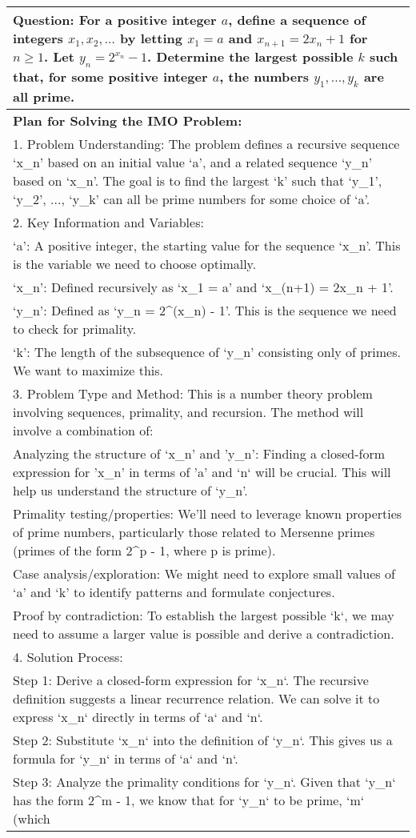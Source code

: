 \begin{table*}
\centering
\scriptsize
\begin{tabular}{p{\linewidth}}
\toprule
\textbf{Question:} For a positive integer $a$, define a sequence of integers $x_{1}, x_{2}, \ldots$ by letting $x_{1}=a$ and $x_{n+1}=2 x_{n}+1$ for $n\geq1$. Let $y_{n}=2^{x_{n}}-1$. Determine the largest possible $k$ such that, for some positive integer $a$, the numbers $y_{1}, \ldots, y_{k}$ are all prime. \\ \midrule
\textbf{Plan for Solving the IMO Problem:}\\ 1. Problem Understanding: The problem defines a recursive sequence `x\_n' based on an initial value `a', and a related sequence `y\_n' based on `x\_n'. The goal is to find the largest `k' such that `y\_1', `y\_2', ..., `y\_k' can all be prime numbers for some choice of `a'.\\2. Key Information and Variables:\\ `a': A positive integer, the starting value for the sequence `x\_n'. This is the variable we need to choose optimally.\\ `x\_n': Defined recursively as `x\_1 = a' and `x\_(n+1) = 2x\_n + 1'.\\ `y\_n': Defined as `y\_n = 2\textasciicircum{}(x\_n) - 1'.  This is the sequence we need to check for primality.\\ `k': The length of the subsequence of `y\_n' consisting only of primes. We want to maximize this.\\3. Problem Type and Method: This is a number theory problem involving sequences, primality, and recursion. The method will involve a combination of:\\ Analyzing the structure of `x\_n' and 'y\_n':  Finding a closed-form expression for 'x\_n' in terms of 'a' and `n` will be crucial. This will help us understand the structure of `y\_n'.\\ Primality testing/properties: We'll need to leverage known properties of prime numbers, particularly those related to Mersenne primes (primes of the form 2\textasciicircum{}p - 1, where p is prime).\\ Case analysis/exploration: We might need to explore small values of `a' and `k' to identify patterns and formulate conjectures.\\ Proof by contradiction:  To establish the largest possible `k`, we may need to assume a larger value is possible and derive a contradiction.\\ 4. Solution Process:\\ Step 1: Derive a closed-form expression for `x\_n`.  The recursive definition suggests a linear recurrence relation. We can solve it to express `x\_n` directly in terms of `a` and `n`.\\ Step 2: Substitute `x\_n` into the definition of `y\_n`. This gives us a formula for `y\_n` in terms of `a` and `n`.\\ Step 3: Analyze the primality conditions for `y\_n`. Given that `y\_n` has the form 2\textasciicircum{}m - 1,  we know that for `y\_n` to be prime, `m` (which 
\end{tabular}
\end{table*}
